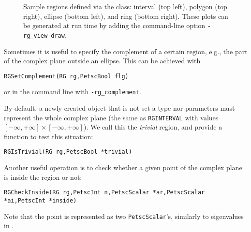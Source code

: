 \begin{figure}[p]
\caption{\label{fig:rg}Sample regions defined via the  class: interval (top left), polygon (top right), ellipse (bottom left), and ring (bottom right). These plots can be generated at run time by adding the command-line option \texttt{-rg\_view draw}.}
\end{figure}

Sometimes it is useful to specify the complement of a certain region, e.g., the part of the complex plane outside an ellipse. This can be achieved with
	\begin{Verbatim}[fontsize=\small]
        RGSetComplement(RG rg,PetscBool flg)
	\end{Verbatim}
or in the command line with \Verb!-rg_complement!.

By default, a newly created  object that is not set a type nor parameters must represent the whole complex plane (the same as \texttt{RGINTERVAL} with values $[-\infty,+\infty]\times[-\infty,+\infty]$). We call this the \emph{trivial} region, and provide a function to test this situation:
	\begin{Verbatim}[fontsize=\small]
        RGIsTrivial(RG rg,PetscBool *trivial)
	\end{Verbatim}

Another useful operation is to check whether a given point of the complex plane is inside the region or not:
	\begin{Verbatim}[fontsize=\small]
        RGCheckInside(RG rg,PetscInt n,PetscScalar *ar,PetscScalar *ai,PetscInt *inside)
	\end{Verbatim}
Note that the point is represented as two \texttt{PetscScalar}'s, similarly to eigenvalues in \slepc.


